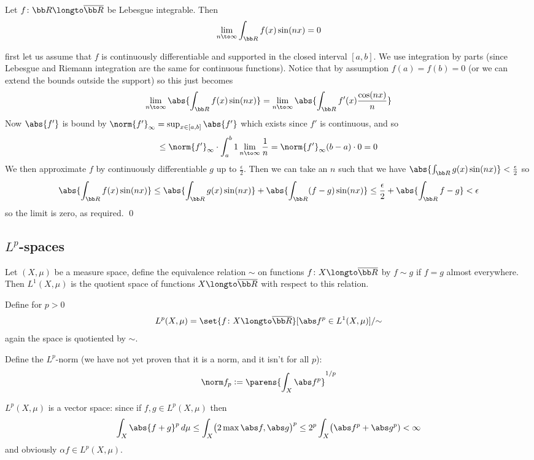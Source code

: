 \bthrm

    Let $f\colon{\bb R}\longto\overline{\bb R}$ be Lebesgue integrable.
    Then
    $$ \lim_{n\to\infty}\int_{\bb R}f(x)\sin(nx) = 0 $$

\ethrm

\Proof first let us assume that $f$ is continuously differentiable and supported in the closed interval $[a,b]$.
We use integration by parts (since Lebesgue and Riemann integration are the same for continuous functions).
Notice that by assumption $f(a)=f(b)=0$ (or we can extend the bounds outside the support) so this just becomes
$$ \lim_{n\to\infty}\abs{\int_{\bb R}f(x)\sin(nx)} = \lim_{n\to\infty}\abs{\int_{\bb R}f'(x)\frac{\cos(nx)}n} $$
Now $\abs{f'}$ is bound by $\norm{f'}_\infty=\sup_{x\in[a,b]}\abs{f'}$ which exists since $f'$ is continuous, and so
$$ \leq \norm{f'}_\infty\cdot\int_a^b1\lim_{n\to\infty}\frac1n = \norm{f'}_\infty(b-a)\cdot0 = 0 $$
We then approximate $f$ by continuously differentiable $g$ up to $\frac\epsilon2$.
Then we can take an $n$ such that we have $\abs{\int_{\bb R}g(x)\sin(nx)}<\frac\epsilon2$ so
$$ \abs{\int_{\bb R}f(x)\sin(nx)} \leq \abs{\int_{\bb R}g(x)\sin(nx)} + \abs{\int_{\bb R}(f-g)\sin(nx)} \leq \frac\epsilon2 + \abs{\int_{\bb R}f-g} < \epsilon $$
so the limit is zero, as required.
\qed

\subsection{$L^p$-spaces}

\bdefn

    Let $(X,\mu)$ be a measure space, define the equivalence relation $\sim$ on functions $f\colon X\longto\overline{\bb R}$ by $f\sim g$ if $f=g$ almost everywhere.
    Then $L^1(X,\mu)$ is the quotient space of functions $X\longto\overline{\bb R}$ with respect to this relation.

    Define for $p>0$
    $$ L^p(X,\mu) = \set{f\colon X\longto\overline{\bb R}}[\abs f^p\in L^1(X,\mu)]/{\sim} $$
    again the space is quotiented by $\sim$.

    Define the $L^p$-norm (we have not yet proven that it is a norm, and it isn't for all $p$):
    $$ \norm f_p \coloneqq \parens{\int_X\abs f^p}^{1/p} $$

\edefn

$L^p(X,\mu)$ is a vector space: since if $f,g\in L^p(X,\mu)$ then
$$ \int_X\abs{f+g}^p\,d\mu \leq \int_X\bigl(2\max{\abs f,\abs g}\bigr)^p \leq 2^p\int_X\bigl(\abs f^p+\abs g^p) < \infty $$
and obviously $\alpha f\in L^p(X,\mu)$.

